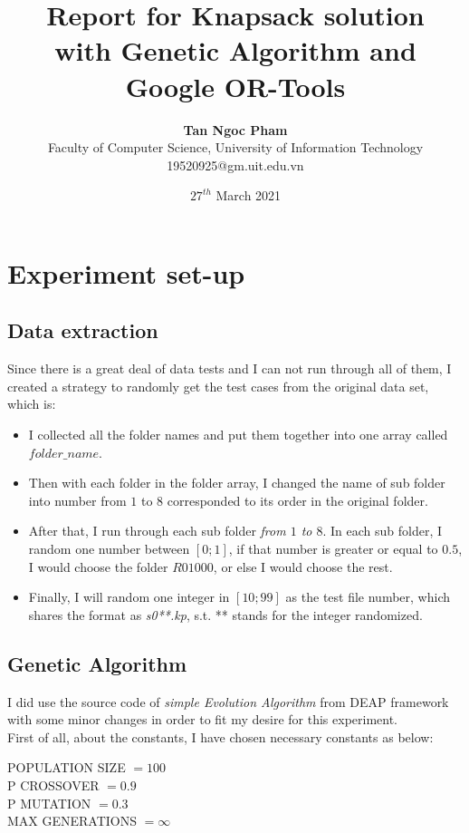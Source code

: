 \documentclass{article}
\title{\textbf{Report for Knapsack solution}\\ with Genetic Algorithm and Google OR-Tools}
\author{\textbf{Tan Ngoc Pham}\\
Faculty of Computer Science, University of Information Technology\\
\small 19520925@gm.uit.edu.vn }
\date{$27^{th}$ March 2021}
\begin{document}
\maketitle

\section{Experiment set-up}
\subsection{Data extraction}
Since there is a great deal of data tests and I can not run through all of them, I created a strategy to randomly get the test cases from the original data set, which is:
\begin{itemize}
    \item I collected all the folder names and put them together into one array called $folder\_name$.
    \item Then with each folder in the folder array, I changed the name of sub folder into number from $1$ to $8$ corresponded to its order in the original folder. 
    \item After that, I run through each sub folder \textit{from $1$ to $8$}. In each sub folder, I random one number between $\left[0;1\right]$, if that number is greater or equal to $0.5$, I would choose the folder $R01000$, or else I would choose the rest.
    \item Finally, I will random one integer in $\left[10; 99\right]$ as the test file number, which shares the format as \textit{s0**.kp}, s.t. ** stands for the integer randomized.
\end{itemize}
\subsection{Genetic Algorithm \cite{genetic-algo}}
I did use the source code of \textit{simple Evolution Algorithm} from DEAP framework with some minor changes in order to fit my desire for this experiment.\\

First of all, about the constants, I have chosen necessary constants as below:
    \begin{center}
        POPULATION SIZE $= 100$\\
        P CROSSOVER $= 0.9$ \\
        P MUTATION $= 0.3$   \\
        MAX GENERATIONS $= \infty$\\
    \end{center}
    
\end{document}
